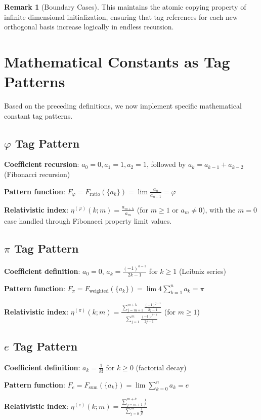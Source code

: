 \documentclass[12pt]{article}
\theoremstyle{plain}
\theoremstyle{definition}
\newtheorem{remark}[theorem]{Remark}
\begin{document}
\begin{remark}[Boundary Cases]
This maintains the atomic copying property of infinite dimensional initialization, ensuring that tag references for each new orthogonal basis increase logically in endless recursion.

\section{Mathematical Constants as Tag Patterns}

Based on the preceding definitions, we now implement specific mathematical constant tag patterns.

\subsection{$\varphi$ Tag Pattern}

\textbf{Coefficient recursion}: $a_0 = 0, a_1 = 1, a_2 = 1$, followed by $a_k = a_{k-1} + a_{k-2}$ (Fibonacci recursion)

\textbf{Pattern function}: $F_\varphi = F_{\text{ratio}}(\{a_k\}) = \lim \frac{a_n}{a_{n-1}} = \varphi$

\textbf{Relativistic index}: $\eta^{(\varphi)}(k; m) = \frac{a_{m+k}}{a_m}$ (for $m \geq 1$ or $a_m \neq 0$), with the $m=0$ case handled through Fibonacci property limit values.

\subsection{$\pi$ Tag Pattern}

\textbf{Coefficient definition}: $a_0 = 0$, $a_k = \frac{(-1)^{k-1}}{2k-1}$ for $k \geq 1$ (Leibniz series)

\textbf{Pattern function}: $F_\pi = F_{\text{weighted}}(\{a_k\}) = \lim 4\sum_{k=1}^n a_k = \pi$

\textbf{Relativistic index}: $\eta^{(\pi)}(k; m) = \frac{\sum_{j=m+1}^{m+k} \frac{(-1)^{j-1}}{2j-1}}{\sum_{j=1}^{m} \frac{(-1)^{j-1}}{2j-1}}$ (for $m \geq 1$)

\subsection{$e$ Tag Pattern}

\textbf{Coefficient definition}: $a_k = \frac{1}{k!}$ for $k \geq 0$ (factorial decay)

\textbf{Pattern function}: $F_e = F_{\text{sum}}(\{a_k\}) = \lim \sum_{k=0}^n a_k = e$

\textbf{Relativistic index}: $\eta^{(e)}(k; m) = \frac{\sum_{j=m+1}^{m+k} \frac{1}{j!}}{\sum_{j=0}^{m} \frac{1}{j!}}$


\end{remark}
\end{document}
